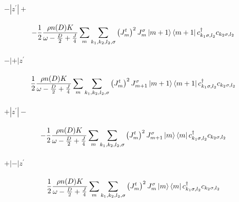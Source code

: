 \documentclass[12pt]{revtex4-2}
\begin{document}
\paragraph{\(-|z^\prime|+\)}
\begin{equation}\begin{aligned}
	-\frac{1}{2}\frac{\rho n(D) K}{\omega - \frac{D}{2} + \frac{J}{4}}\sum_{m}\sum_{k_1,k_2,l_2,\sigma} \left( J^t_m \right) ^2 J^\sigma_m \ket{m+1}\bra{m+1}c^\dagger_{k_1 \sigma, l_2}c_{k_2 \sigma,l_2}
\end{aligned}\end{equation}

\paragraph{\(-|+|z^\prime\)}
\begin{equation}\begin{aligned}
	\frac{1}{2}\frac{\rho n(D) K}{\omega - \frac{D}{2} + \frac{J}{4}}\sum_{m}\sum_{k_1,k_2,l_2,\sigma} \left( J^t_m \right) ^2 J^\sigma_{m+1} \ket{m+1}\bra{m+1}c^\dagger_{k_1 \sigma, l_2}c_{k_2 \sigma,l_2}
\end{aligned}\end{equation}

\paragraph{\(+|z^\prime|-\)}
\begin{equation}\begin{aligned}
	-\frac{1}{2}\frac{\rho n(D) K}{\omega - \frac{D}{2} + \frac{J}{4}}\sum_{m}\sum_{k_1,k_2,l_2,\sigma} \left( J^t_m \right) ^2 J^\sigma_{m+1} \ket{m}\bra{m}c^\dagger_{k_1 \sigma, l_2}c_{k_2 \sigma,l_2}
\end{aligned}\end{equation}

\paragraph{\(+|-|z^\prime\)}
\begin{equation}\begin{aligned}
	\frac{1}{2}\frac{\rho n(D) K}{\omega - \frac{D}{2} + \frac{J}{4}}\sum_{m}\sum_{k_1,k_2,l_2,\sigma} \left( J^t_m \right) ^2 J^\sigma_{m} \ket{m}\bra{m}c^\dagger_{k_1 \sigma, l_2}c_{k_2 \sigma,l_2}
\end{aligned}\end{equation}
\end{document}
